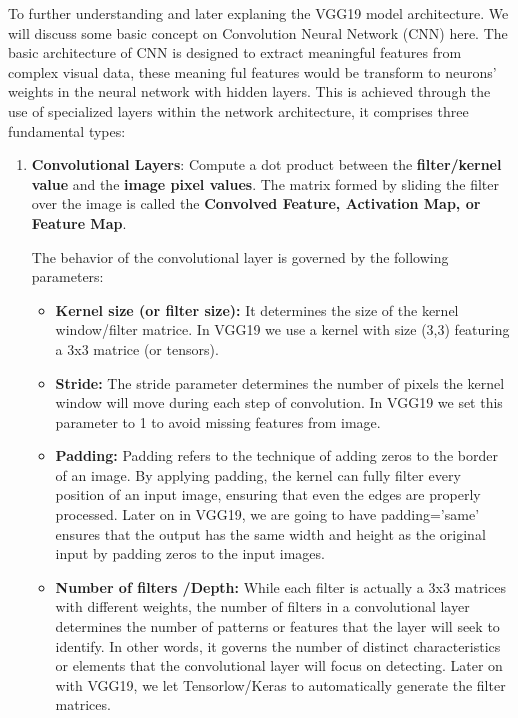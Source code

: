 \documentclass[12pt]{article}
\begin{document}
To further understanding and later explaning the VGG19 model architecture. We will discuss some basic concept on Convolution Neural Network (CNN) here. The basic architecture of CNN is designed to extract meaningful features from complex visual data, these meaning ful features would be transform to neurons' weights in the neural network with hidden layers. This is achieved through the use of specialized layers within the network architecture, it comprises three fundamental types:

    \begin{enumerate}
        \item \textbf{Convolutional Layers}: Compute a dot product between the \textbf{filter/kernel value} and the \textbf{image pixel values}. The matrix formed by sliding the filter over the image is called the \textbf{Convolved Feature, Activation Map, or Feature Map}.

        The behavior of the convolutional layer is governed by the following parameters:

        \begin{itemize}
            \item \textbf{Kernel size (or filter size):} It determines the size of the kernel window/filter matrice. In VGG19 we use a kernel with size (3,3) featuring a 3x3 matrice (or tensors).
            \item \textbf{Stride:} The stride parameter determines the number of pixels the kernel window will move during each step of convolution. In VGG19 we set this parameter to 1 to avoid missing features from image.
            \item \textbf{Padding:}  Padding refers to the technique of adding zeros to the border of an image. By applying padding, the kernel can fully filter every position of an input image, ensuring that even the edges are properly processed. Later on in VGG19, we are going to have padding='same' ensures that the output has the same width and height as the original input by padding zeros to the input images.
            \item \textbf{Number of filters /Depth:} While each filter is actually a 3x3 matrices with different weights, the number of filters in a convolutional layer determines the number of patterns or features that the layer will seek to identify. In other words, it governs the number of distinct characteristics or elements that the convolutional layer will focus on detecting. Later on with VGG19, we let Tensorlow/Keras to automatically generate the filter matrices.
        \end{itemize}


\end{enumerate}
\end{document}
